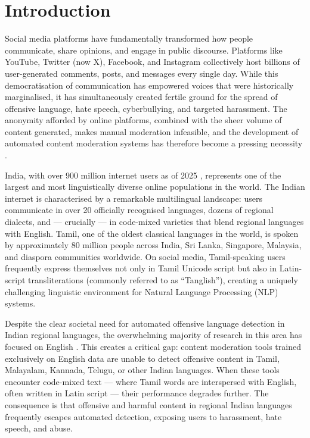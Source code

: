 \documentclass[12pt, a4paper]{article}
\begin{document}
\thispagestyle{empty}
\newpage
\setcounter{page}{1}

\section{Introduction}
\label{sec:introduction}

Social media platforms have fundamentally transformed how people communicate, share opinions, and engage in public discourse. Platforms like YouTube, Twitter (now X), Facebook, and Instagram collectively host billions of user-generated comments, posts, and messages every single day. While this democratisation of communication has empowered voices that were historically marginalised, it has simultaneously created fertile ground for the spread of offensive language, hate speech, cyberbullying, and targeted harassment. The anonymity afforded by online platforms, combined with the sheer volume of content generated, makes manual moderation infeasible, and the development of automated content moderation systems has therefore become a pressing necessity \citep{fortuna2018survey}.

India, with over 900 million internet users as of 2025 \citep{iamai2025}, represents one of the largest and most linguistically diverse online populations in the world. The Indian internet is characterised by a remarkable multilingual landscape: users communicate in over 20 officially recognised languages, dozens of regional dialects, and --- crucially --- in code-mixed varieties that blend regional languages with English. Tamil, one of the oldest classical languages in the world, is spoken by approximately 80 million people across India, Sri Lanka, Singapore, Malaysia, and diaspora communities worldwide. On social media, Tamil-speaking users frequently express themselves not only in Tamil Unicode script but also in Latin-script transliterations (commonly referred to as ``Tanglish''), creating a uniquely challenging linguistic environment for Natural Language Processing (NLP) systems.

Despite the clear societal need for automated offensive language detection in Indian regional languages, the overwhelming majority of research in this area has focused on English \citep{fortuna2018survey, schmidt2017survey}. This creates a critical gap: content moderation tools trained exclusively on English data are unable to detect offensive content in Tamil, Malayalam, Kannada, Telugu, or other Indian languages. When these tools encounter code-mixed text --- where Tamil words are interspersed with English, often written in Latin script --- their performance degrades further. The consequence is that offensive and harmful content in regional Indian languages frequently escapes automated detection, exposing users to harassment, hate speech, and abuse.
\end{document}
